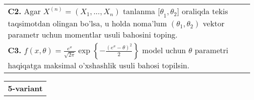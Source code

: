 \documentclass{article}
\begin{document}
\begin{tabular}{m{17cm}}
\\
\textbf{C2.} 
Agar \(X^{(n)} = \left( X_{1},...,X_{n} \right)\) tanlanma \({\lbrack\theta}_{1},\theta_{2}\rbrack\) oraliqda tekis taqsimotdan olingan bo'lsa, u holda noma'lum \(\left( \theta_{1},\theta_{2} \right)\) vektor parametr uchun momentlar usuli bahosini toping.
\\
\textbf{C3.} 
\(f(x,\theta) = \frac{e^{x}}{\sqrt{2\pi}}\exp\left\{ - \frac{\left( e^{x} - \theta \right)^{2}}{2} \right\}\) model uchun \(\theta\) parametri haqiqatga maksimal o'xshashlik usuli bahosi topilsin.
\\

\end{tabular}
\vspace{1cm}


\begin{tabular}{m{17cm}}
\textbf{5-variant}
\newline


\end{tabular}
\end{document}
